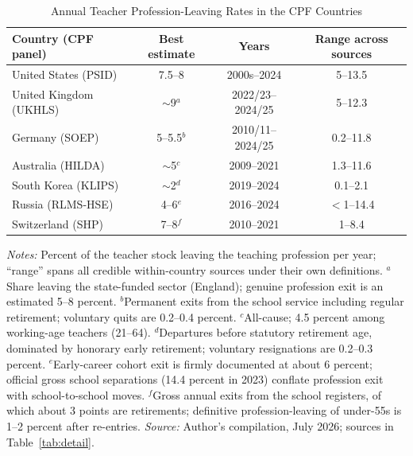 \documentclass[11pt,a4paper]{article}
\newcommand{\fignote}[1]{\par\vspace{4pt}%
  \begin{minipage}{\linewidth}\footnotesize\color{ecgray}#1\end{minipage}}
\begin{document}
\begin{table}[H]
\centering\small
\caption{Annual Teacher Profession-Leaving Rates in the CPF Countries}
\label{tab:head}
\begin{tabular}{lccc}
\toprule
Country (CPF panel) & Best estimate & Years & Range across sources \\
\midrule
United States (PSID)        & 7.5--8            & 2000s--2024      & 5--13.5 \\
United Kingdom (UKHLS)      & $\sim$9$^{a}$     & 2022/23--2024/25 & 5--12.3 \\
Germany (SOEP)              & 5--5.5$^{b}$      & 2010/11--2024/25 & 0.2--11.8 \\
Australia (HILDA)           & $\sim$5$^{c}$     & 2009--2021       & 1.3--11.6 \\
South Korea (KLIPS)         & $\sim$2$^{d}$     & 2019--2024       & 0.1--2.1 \\
Russia (RLMS-HSE)           & 4--6$^{e}$        & 2016--2024       & $<$1--14.4 \\
Switzerland (SHP)           & 7--8$^{f}$        & 2010--2021       & 1--8.4 \\
\bottomrule
\end{tabular}
\fignote{\textit{Notes:} Percent of the teacher stock leaving the
teaching profession per year; ``range'' spans all credible
within-country sources under their own definitions.
$^{a}$Share leaving the state-funded sector (England); genuine
profession exit is an estimated 5--8 percent.
$^{b}$Permanent exits from the school service including regular
retirement; voluntary quits are 0.2--0.4 percent.
$^{c}$All-cause; 4.5 percent among working-age teachers (21--64).
$^{d}$Departures before statutory retirement age, dominated by
honorary early retirement; voluntary resignations are 0.2--0.3
percent.
$^{e}$Early-career cohort exit is firmly documented at about 6
percent; official gross school separations (14.4 percent in 2023)
conflate profession exit with school-to-school moves.
$^{f}$Gross annual exits from the school registers, of which about 3
points are retirements; definitive profession-leaving of under-55s is
1--2 percent after re-entries.
\textit{Source:} Author's compilation, July 2026; sources in
Table~\ref{tab:detail}.}
\end{table}
\end{document}
